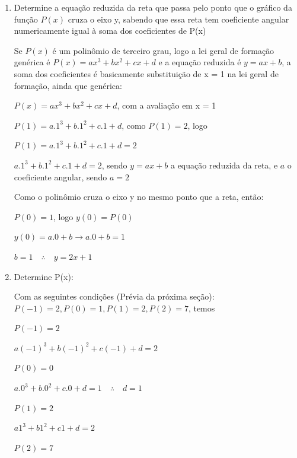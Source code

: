 \begin{multicols*}{2}
\begin{enumerate}
            \begin{enumerate}
            
            \item Determine a equação reduzida da reta que passa pelo ponto que o gráfico da função $P(x)$ 			cruza o eixo y, sabendo que essa reta tem coeficiente angular numericamente igual à soma dos 			coeficientes de P(x)
            
            Se $P(x)$ é um polinômio de terceiro grau, logo a lei geral de formação genérica é 
            $P(x) = ax^3 + bx^2 + cx +d$ e a equação reduzida é $y = ax +b$, a soma dos coeficientes é 				basicamente substituição de x = 1 na lei geral de formação, ainda que genérica:
            
            $P(x) = ax^3 + bx^2 + cx +d$, com a avaliação em x = 1
            
            $P(1) = a.1^3 + b.1^2 + c.1 +d$, como $P(1) =  2$, logo
            
            $P(1) = a.1^3 + b.1^2 + c.1 +d = 2$
            
            $a.1^3 + b.1^2 + c.1 +d = 2$, sendo $y = ax +b$ a equação reduzida da reta, e $a$ o coeficiente 		angular, sendo $a = 2$
            
            Como o polinômio cruza o eixo y no mesmo ponto que a reta, então:
            
            $P(0) = 1$, logo $y(0) = P(0)$
            
            $y(0) = a.0+b \rightarrow a.0 +b = 1$
            
            $b = 1 \quad \therefore \quad y = 2x + 1$
            
            \item Determine P(x):
            
            Com as seguintes condições (Prévia da próxima seção):
            $P(-1) = 2, P(0) = 1, P(1) = 2, P(2) = 7$, temos
            
            $P(-1) = 2$
            
            $a(-1)^3 + b(-1)^2 + c(-1) + d = 2$
            
            $P(0) = 0 $
            
            $a.0^3 + b.0^2 + c.0 + d = 1 \quad \therefore \quad d = 1$
            
            $P(1) = 2$
            
            $a1^3 + b1^2 + c1 + d = 2$
    
            $P(2) = 7$		
            

\end{enumerate}
\end{enumerate}
\end{multicols*}
